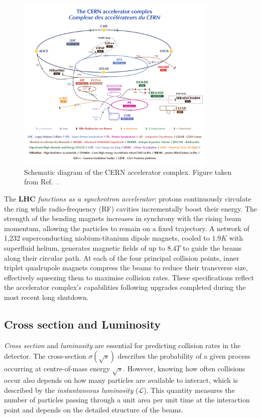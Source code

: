 \begin{figure}[h]
\centering
\includegraphics[width= 0.85\textwidth]{Figures/Chapter3/LHC_AcceleratorComplex.pdf}
\caption[Schematic diagram of the CERN accelerator complex]{Schematic diagram of the CERN accelerator complex. Figure taken from Ref.~\cite{LHC_InjectorComplex}.}
\label{Figure:Chapter3_LHC_Complex}
\end{figure}

The \textbf{LHC} \textit{functions as a synchrotron accelerator}: protons continuously circulate the ring while radio-frequency (RF) cavities incrementally boost their energy. The strength of the bending magnets increases in synchrony with the rising beam momentum, allowing the particles to remain on a fixed trajectory. A network of 1,232 superconducting niobium-titanium dipole magnets, cooled to $1.9\unit{K}$ with superfluid helium, generates magnetic fields of up to $8.4\unit{T}$ to guide the beams along their circular path. At each of the four principal collision points, inner triplet quadrupole magnets compress the beams to reduce their transverse size, effectively squeezing them to maximise collision rates. These specifications reflect the accelerator complex's capabilities following upgrades completed during the most recent long shutdown.

\subsection{Cross section and Luminosity}

\textit{Cross section} and \textit{luminosity} are essential for predicting collision rates in the detector. The cross-section $\sigma(\sqrt{s})$ describes the probability of a given process occurring at centre-of-mass energy $\sqrt{s}$. However, knowing how often collisions occur also depends on how many particles are available to interact, which is described by the \textit{instantaneous luminosity} ($\mathscr{L}$). This quantity measures the number of particles passing through a unit area per unit time at the interaction point and depends on the detailed structure of the beams.


